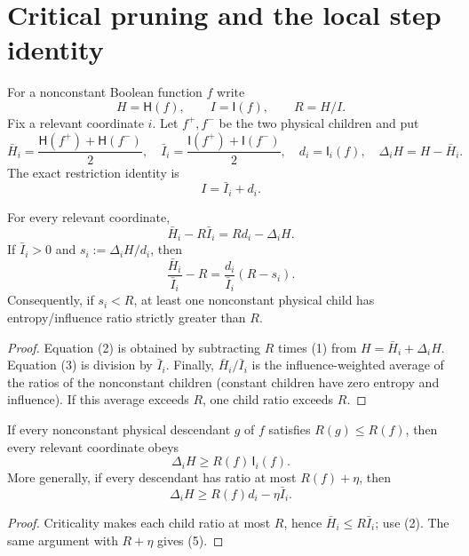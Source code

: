\section*{Critical pruning and the local step identity}

For a nonconstant Boolean function $f$ write
\[
 H=\mathsf H(f),\qquad I=\mathsf I(f),\qquad R=H/I.
\]
Fix a relevant coordinate $i$.  Let $f^+,f^-$ be the two physical
children and put
\[
 \bar H_i=\frac{\mathsf H(f^+)+\mathsf H(f^-)}2,
 \quad
 \bar I_i=\frac{\mathsf I(f^+)+\mathsf I(f^-)}2,
 \quad d_i=\mathsf I_i(f),
 \quad \Delta_iH=H-\bar H_i.
\]
The exact restriction identity is
\[
 I=\bar I_i+d_i.                                      \tag{1}
\]

\begin{lemma}\label{lem:pruning}
For every relevant coordinate,
\[
 \boxed{\bar H_i-R\bar I_i=Rd_i-\Delta_iH.}           \tag{2}
\]
If $\bar I_i>0$ and $s_i:=\Delta_iH/d_i$, then
\[
 \frac{\bar H_i}{\bar I_i}-R
 =\frac{d_i}{\bar I_i}(R-s_i).                        \tag{3}
\]
Consequently, if $s_i<R$, at least one nonconstant physical child has
entropy/influence ratio strictly greater than $R$.
\end{lemma}

\begin{proof}
Equation (2) is obtained by subtracting $R$ times (1) from
$H=\bar H_i+\Delta_iH$.  Equation (3) is division by $\bar I_i$.
Finally, $\bar H_i/\bar I_i$ is the influence-weighted average of the ratios
of the nonconstant children (constant children have zero entropy and
influence).  If this average exceeds $R$, one child ratio exceeds $R$.
\end{proof}

\begin{corollary}
If every nonconstant physical descendant $g$ of $f$ satisfies
$R(g)\le R(f)$, then every relevant coordinate obeys
\[
 \boxed{\Delta_iH\ge R(f)\,\mathsf I_i(f).}            \tag{4}
\]
More generally, if every descendant has ratio at most $R(f)+\eta$, then
\[
 \Delta_iH\ge R(f)d_i-\eta\bar I_i.                  \tag{5}
\]
\end{corollary}

\begin{proof}
Criticality makes each child ratio at most $R$, hence
$\bar H_i\le R\bar I_i$; use (2).  The same argument with $R+\eta$
gives (5).
\end{proof}

